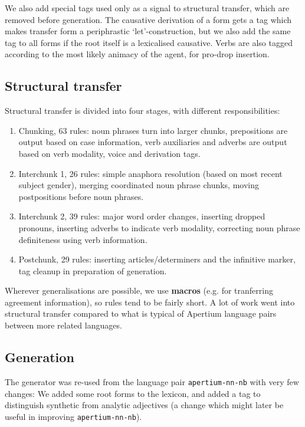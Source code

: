 \documentclass{book}
\begin{document}
We also add special tags used only as a signal to structural transfer,
which are removed before generation. The causative derivation of a
form gets a tag which makes transfer form a periphrastic
`let'-construction, but we also add the same tag to all forms if the
root itself is a lexicalised causative. Verbs are also tagged
according to the most likely animacy of the agent, for pro-drop
insertion.

\subsection{Structural transfer}
\label{sec:structural-transfer}
Structural transfer is divided into four stages, with different
responsibilities:

\begin{enumerate}

\item Chunking, 63 rules: noun phrases turn into larger chunks,
  prepositions are output based on case information, verb auxiliaries
  and adverbs are output based on verb modality, voice and derivation
  tags.

\item Interchunk 1, 26 rules: simple anaphora resolution (based on
  most recent subject gender), merging coordinated noun phrase chunks,
  moving postpositions before noun phrases.

\item Interchunk 2, 39 rules: major word order changes, inserting
  dropped pronouns, inserting adverbs to indicate verb modality,
  correcting noun phrase definiteness using verb information.

\item Postchunk, 29 rules: inserting articles/determiners and the
  infinitive marker, tag cleanup in preparation of generation.
\end{enumerate}

Wherever generalisations are possible, we use \textbf{macros} (e.g.
for tranferring agreement information), so rules tend to be fairly
short. A lot of work went into structural transfer compared to what is
typical of Apertium language pairs between more related languages.

\subsection{Generation}
The generator was re-used from the language pair
\texttt{apertium-nn-nb} with very few changes: We added some root
forms to the lexicon, and added a tag to distinguish synthetic from analytic
adjectives (a change which might later be useful in improving
\texttt{apertium-nn-nb}).
\end{document}
